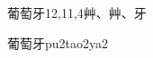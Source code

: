 \begin{entry}{葡萄牙}{12,11,4}{⾋、⾋、⽛}
  \begin{phonetics}{葡萄牙}{pu2tao2ya2}
  \end{phonetics}
\end{entry}
